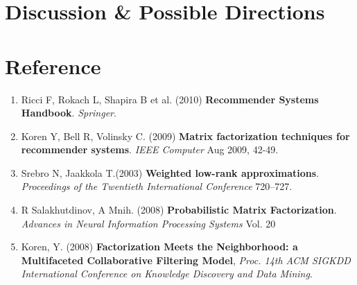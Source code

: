 \documentclass[11pt]{article}
\theoremstyle{definition}
\begin{document}
\newpage
\section{\textbf{Discussion \& Possible Directions}}


\newpage
\section*{\textbf{Reference}}
\begin{enumerate}
\item \label{ref:handbook}
Ricci F, Rokach L, Shapira B et al. (2010) \textbf{Recommender Systems Handbook}. \textit{Springer}. 
\item \label{ref:MFieee}
Koren Y, Bell R, Volinsky C. (2009) \textbf{Matrix factorization techniques for recommender systems}. \textit{IEEE Computer} Aug 2009, 42-49. 
\item \label{ref:WLA}
Srebro N,  Jaakkola T.(2003) \textbf{Weighted low-rank approximations}. \textit{Proceedings of the Twentieth International Conference} 720–727.
\item \label{ref:PMF}
R Salakhutdinov, A Mnih. (2008) \textbf{Probabilistic Matrix Factorization}. \textit{Advances in Neural Information Processing Systems} Vol. 20

\item \label{ref:implicit}
Koren, Y. (2008) \textbf{Factorization Meets the Neighborhood: a Multifaceted Collaborative Filtering Model}, \textit{Proc. 14th ACM SIGKDD International Conference on Knowledge Discovery and
Data Mining}.

\end{enumerate}
\end{document}
